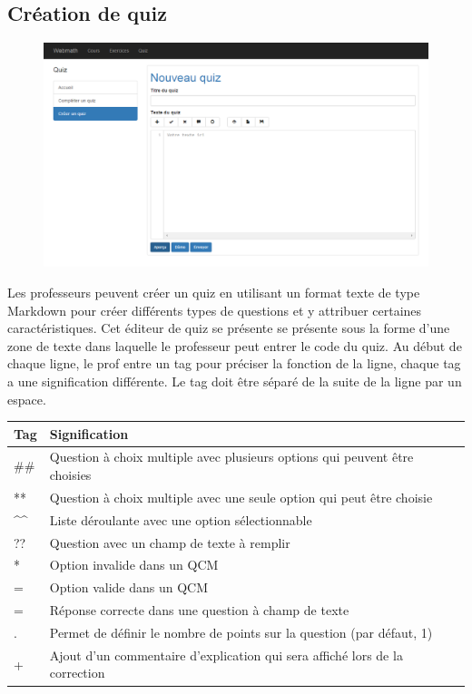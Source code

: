 \documentclass[letterpaper,10pt,french]{sphinxmanual}
\begin{document}
\subsection{Création de quiz}
\label{functionalities:creation-de-quiz}\begin{figure}[htbp]
\centering

\includegraphics{create.png}
\end{figure}

Les professeurs peuvent créer un quiz en utilisant un format texte de type Markdown pour créer différents types de questions et y attribuer certaines caractéristiques. Cet éditeur de quiz se présente se présente sous la forme d'une zone de texte dans laquelle le professeur peut entrer le code du quiz. Au début de chaque ligne, le prof entre un tag pour préciser la fonction de la ligne, chaque tag a une signification différente. Le tag doit être séparé de la suite de la ligne par un espace.

\begin{tabulary}{\linewidth}{|L|L|}
\hline
\textsf{\relax 
Tag
} & \textsf{\relax 
Signification
}\\
\hline
\#\#
 & 
Question à choix multiple avec plusieurs options qui peuvent être choisies
\\

**
 & 
Question à choix multiple avec une seule option qui peut être choisie
\\

\textasciicircum{}\textasciicircum{}
 & 
Liste déroulante avec une option sélectionnable
\\

??
 & 
Question avec un champ de texte à remplir
\\

*
 & 
Option invalide dans un QCM
\\

=
 & 
Option valide dans un QCM
\\

=
 & 
Réponse correcte dans une question à champ de texte
\\

.
 & 
Permet de définir le nombre de points sur la question (par défaut, 1)
\\

+
 & 
Ajout d'un commentaire d'explication qui sera affiché lors de la correction
\\
\hline\end{tabulary}
\end{document}
